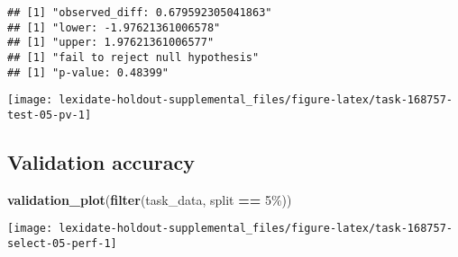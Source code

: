 \documentclass[
]{book}
\newenvironment{Shaded}{\begin{snugshade}}{\end{snugshade}}
\newcommand{\AttributeTok}[1]{\textcolor[rgb]{0.13,0.29,0.53}{#1}}
\newcommand{\DecValTok}[1]{\textcolor[rgb]{0.00,0.00,0.81}{#1}}
\newcommand{\FunctionTok}[1]{\textcolor[rgb]{0.13,0.29,0.53}{\textbf{#1}}}
\newcommand{\NormalTok}[1]{#1}
\newcommand{\OtherTok}[1]{\textcolor[rgb]{0.56,0.35,0.01}{#1}}
\newcommand{\SpecialCharTok}[1]{\textcolor[rgb]{0.81,0.36,0.00}{\textbf{#1}}}
\newcommand{\StringTok}[1]{\textcolor[rgb]{0.31,0.60,0.02}{#1}}
\begin{document}
\begin{Shaded}
\end{Shaded}

\begin{verbatim}
## [1] "observed_diff: 0.679592305041863"
## [1] "lower: -1.97621361006578"
## [1] "upper: 1.97621361006577"
## [1] "fail to reject null hypothesis"
## [1] "p-value: 0.48399"
\end{verbatim}

\texttt{[image: lexidate-holdout-supplemental\_files/figure-latex/task-168757-test-05-pv-1]}

\hypertarget{validation-accuracy-20}{%
\subsection{Validation accuracy}\label{validation-accuracy-20}}

\begin{Shaded}
\begin{Highlighting}[]
\FunctionTok{validation\_plot}\NormalTok{(}\FunctionTok{filter}\NormalTok{(task\_data, split }\SpecialCharTok{==} \StringTok{\textquotesingle{}5\%\textquotesingle{}}\NormalTok{))}
\end{Highlighting}
\end{Shaded}

\texttt{[image: lexidate-holdout-supplemental\_files/figure-latex/task-168757-select-05-perf-1]}
\end{document}
